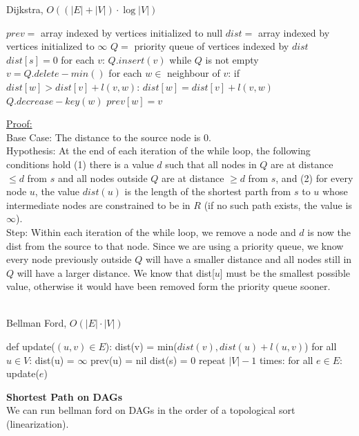 \documentclass{article}
\begin{document}
\begin{multicols}{2}
\setlength{\textfloatsep}{0.0cm}
\begin{algorithm}[H]
\label{alg:quad}
\caption{Dijkstra, $O((|E| + |V|) \cdot \log |V|)$}\label{euclid}
\begin{algorithmic}[1]
\State $prev =$ array indexed by vertices initialized to null 
\State $dist =$ array indexed by vertices initialized to $\infty$
\State $Q =$ priority queue of vertices indexed by $dist$
\State $dist[s] = 0$
\State for each $v$: 
\Indent 
\State $Q.insert(v)$
\EndIndent 
\State while $Q$ is not empty
\Indent 
\State $v = Q.delete-min()$
\State for each $w \in$ neighbour of $v$: 
\Indent 
\State if $dist[w] > dist[v] + l(v, w)$: 
\Indent 
\State $dist[w] = dist[v] + l(v, w)$
\State $Q.decrease-key(w)$
\State $prev[w] = v$
\EndIndent 
\EndIndent 
\EndIndent
\end{algorithmic}
\end{algorithm}
\setlength{\floatsep}{0.0cm}
\underline{Proof:} \\
Base Case: The distance to the source node is 0. \\
Hypothesis: At the end of each iteration of the while loop, the following conditions hold (1) there is a value $d$ such that all nodes in $Q$ are at distance $\leq d$ from $s$ and all nodes outside $Q$ are at distance $\geq d$ from $s$, and (2) for every node $u$, the value $dist(u)$ is the length of the shortest parth from $s$ to $u$ whose intermediate nodes are constrained to be in $R$ (if no such path exists, the value is $\infty$). \\
Step: Within each iteration of the while loop, we remove a node and $d$ is now the dist from the source to that node. Since we are using a priority queue, we know every node previously outside $Q$ will have a smaller distance and all nodes still in $Q$ will have a larger distance. We know that dist[$u$] must be the smallest possible value, otherwise it would have been removed form the priority queue sooner. \\ \\
\setlength{\textfloatsep}{0.0cm}
\begin{algorithm}[H]
\label{alg:quad}
\caption{Bellman Ford, $O(|E| \cdot |V|)$}\label{euclid}
\begin{algorithmic}[1]
\State def update($(u, v) \in E$):
\Indent 
\State dist(v) = min($dist(v), dist(u) + l(u, v)$)
\EndIndent 
\State for all $u \in V$:
\Indent 
\State dist(u) = $\infty$
\State prev(u) = nil
\EndIndent 
\State dist(s) = 0 
\State repeat $|V| -1$ times:
\Indent 
\State for all $e \in E$:
\Indent 
\State update($e$)
\EndIndent 
\EndIndent 
\end{algorithmic}
\end{algorithm}
\setlength{\floatsep}{0.0cm}
\textbf{Shortest Path on DAGs} \\
We can run bellman ford on DAGs in the order of a topological sort (linearization). 

\end{multicols}
\end{document}
